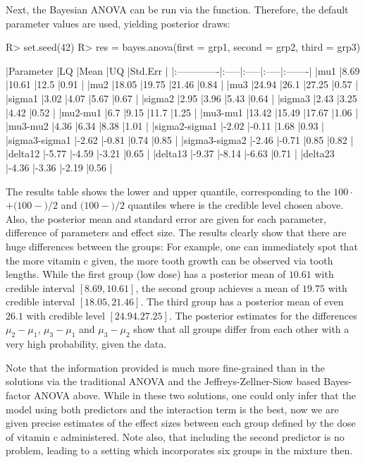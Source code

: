 Next, the Bayesian ANOVA can be run via the  function. Therefore, the default parameter values are used, yielding  posterior draws:
\begin{example}
R> set.seed(42)
R> res = bayes.anova(first = grp1, second = grp2, third = grp3)

|Parameter     |LQ    |Mean  |UQ    |Std.Err |
|:-------------|:-----|:-----|:-----|:-------|
|mu1           |8.69  |10.61 |12.5  |0.91    |
|mu2           |18.05 |19.75 |21.46 |0.84    |
|mu3           |24.94 |26.1  |27.25 |0.57    |
|sigma1        |3.02  |4.07  |5.67  |0.67    |
|sigma2        |2.95  |3.96  |5.43  |0.64    |
|sigma3        |2.43  |3.25  |4.42  |0.52    |
|mu2-mu1       |6.7   |9.15  |11.7  |1.25    |
|mu3-mu1       |13.42 |15.49 |17.67 |1.06    |
|mu3-mu2       |4.36  |6.34  |8.38  |1.01    |
|sigma2-sigma1 |-2.02 |-0.11 |1.68  |0.93    |
|sigma3-sigma1 |-2.62 |-0.81 |0.74  |0.85    |
|sigma3-sigma2 |-2.46 |-0.71 |0.85  |0.82    |
|delta12       |-5.77 |-4.59 |-3.21 |0.65    |
|delta13       |-9.37 |-8.14 |-6.63 |0.71    |
|delta23       |-4.36 |-3.36 |-2.19 |0.56    |
\end{example}
The results table shows the lower and upper quantile, corresponding to the $100\cdot $$+(100-$$)/2$ and $(100-$$)/2$ quantiles where  is the credible level chosen above. Also, the posterior mean and standard error are given for each parameter, difference of parameters and effect size.
The results clearly show that there are huge differences between the groups: For example, one can immediately spot that the more vitamin c given, the more tooth growth can be observed via tooth lengths. While the first group (low dose) has a posterior mean of $10.61$ with credible interval $[8.69,10.61]$, the second group achieves a mean of $19.75$ with credible interval $[18.05,21.46]$. The third group has a posterior mean of even $26.1$ with credible level $[24.94.27.25]$. The posterior estimates for the differences $\mu_2-\mu_1$, $\mu_3-\mu_1$ and $\mu_3-\mu_2$ show that all groups differ from each other with a very high probability, given the data.

Note that the information provided is much more fine-grained than in the solutions via the traditional ANOVA and the Jeffreys-Zellner-Siow based Bayes-factor ANOVA above. While in these two solutions, one could only infer that the model using both predictors and the interaction term is the best, now we are given precise estimates of the effect sizes between each group defined by the dose of vitamin c administered. Note also, that including the second predictor  is no problem, leading to a setting which incorporates six groups in the mixture then.

